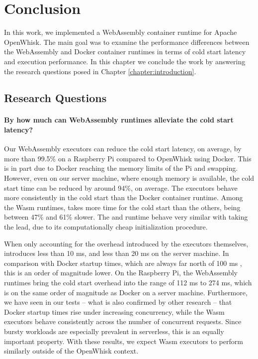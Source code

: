 \chapter{Conclusion}
\label{chapter:conclusion}

In this work, we implemented a WebAssembly container runtime for Apache OpenWhisk. The main goal was to examine the performance differences between the WebAssembly and Docker container runtimes in terms of cold start latency and execution performance. In this chapter we conclude the work by answering the research questions posed in Chapter \ref{chapter:introduction}.

\section{Research Questions}

\subsubsection*{By how much can WebAssembly runtimes alleviate the cold start latency?}

Our WebAssembly executors can reduce the cold start latency, on average, by more than 99.5\% on a Raspberry Pi compared to OpenWhisk using Docker. This is in part due to Docker reaching the memory limits of the Pi and swapping. However, even on our server machine, where enough memory is available, the cold start time can be reduced by around 94\%, on average. The executors behave more consistently in the cold start than the Docker container runtime. Among the Wasm runtimes,  takes more time for the cold start than the others, being between 47\% and 61\% slower. The  and  runtime behave very similar with  taking the lead, due to its computationally cheap initialization procedure.

When only accounting for the overhead introduced by the executors themselves,  introduces less than 10 ms, and  less than 20 ms on the server machine. In comparison with Docker startup times, which are always far north of 100 ms \cite{Wang2018, Manner2018}, this is an order of magnitude lower.
On the Raspberry Pi, the WebAssembly runtimes bring the cold start overhead into the range of 112 ms to 274 ms, which is on the same order of magnitude as Docker on a server machine.
Furthermore, we have seen in our tests -- what is also confirmed by other research \cite{Mohan2019} -- that Docker startup times rise under increasing concurrency, while the Wasm executors behave consistently across the number of concurrent requests. Since bursty workloads are especially prevalent in serverless, this is an equally important property. With these results, we expect Wasm executors to perform similarly outside of the OpenWhisk context.

